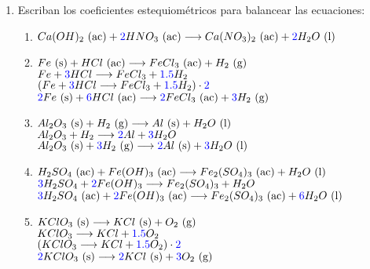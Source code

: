 \documentclass[../practica.root.tex]{subfiles}
\begin{document}
\begin{enumerate}
    \item Escriban los coeficientes estequiométricos para balancear las ecuaciones:
          \begin{enumerate}
              \item $Ca(OH)_2 \eac + \blue{2}HNO_3 \eac \lra Ca(NO_3)_2 \eac + \blue{2}H_2O \el$
              \item $Fe \es + HCl \eac \lra FeCl_3 \eac + H_2 \eg$ \\
                    $Fe + \blue{3}HCl \lra FeCl_3 + \blue{\num{1,5}}H_2$ \\
                    $(Fe + \blue{3}HCl \lra FeCl_3 + \blue{\num{1,5}}H_2)\cdot\blue{\num{2}}$ \\
                    $\blue{2}Fe \es + \blue{6}HCl \eac \lra \blue{2}FeCl_3 \eac + \blue{3}H_2 \eg$
              \item $Al_2O_3 \es + H_2 \eg \lra Al \es + H_2O \el$ \\
                    $Al_2O_3 + H_2 \lra \blue{2}Al + \blue{3}H_2O$ \\
                    $Al_2O_3 \es + \blue{3}H_2 \eg \lra \blue{2}Al \es + \blue{3}H_2O \el$
              \item $H_2SO_4 \eac + Fe(OH)_3 \eac \lra Fe_2(SO_4)_3 \eac + H_2O \el$ \\
                    $\blue{3}H_2SO_4 + \blue{2}Fe(OH)_3 \lra Fe_2(SO_4)_3 + H_2O$ \\
                    $\blue{3}H_2SO_4 \eac + \blue{2}Fe(OH)_3 \eac \lra Fe_2(SO_4)_3 \eac + \blue{6}H_2O \el$
              \item $KClO_3 \es \lra KCl \es + O_2 \eg$ \\
                    $KClO_3 \lra KCl + \blue{\num{1,5}}O_2$ \\
                    $(KClO_3 \lra KCl + \blue{\num{1,5}}O_2)\cdot\blue{\num{2}}$ \\
                    $\blue{2}KClO_3 \es \lra \blue{2}KCl \es + \blue{3}O_2 \eg$
          \end{enumerate}


\end{enumerate}
\end{document}
